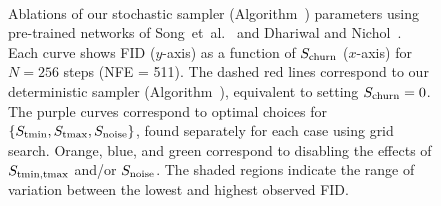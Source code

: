 {\begin{figure}[t]
{
}\\\hfill%
\hfill%
\hfill%
\hfill%
\caption{\label{fig:SdePlotChurn}%
Ablations of our stochastic sampler (Algorithm~) parameters using pre-trained networks of Song~et~al.~\cite{Song2021sde} and Dhariwal and Nichol~\cite{Dhariwal2021}.
Each curve shows FID ($y$-axis) as a function of $S_\text{churn}$ ($x$-axis) for $N = 256$ steps (NFE = 511).
The dashed red lines correspond to our deterministic sampler (Algorithm~), equivalent to setting $S_\text{churn} = 0$.
The purple curves correspond to optimal choices for $\{S_\text{tmin}, S_\text{tmax}, S_\text{noise}\}$, found separately for each case using grid search.
Orange, blue, and green correspond to disabling the effects of $S_\text{tmin,tmax}$ and/or $S_\text{noise}$.
The shaded regions indicate the range of variation between the lowest and highest observed FID.
}
\end{figure}
}

\newcommand{\tabSdeTable}{%
\forcenewcolumntype{x}{>{\centering\arraybackslash\hspace{0pt}}p{12mm}}%
\renewcommand{\cs}{\hspace{0.5mm}}%
\tabulinesep=0.7mm%
\tabulinestyle{0.17mm}%
\begin{table}[t]%
\centering%
\footnotesize%
\caption{\label{tab:SdeTable}%
Evaluation and ablations of our improvements to stochastic sampling.
The values correspond to the curves shown in Figure~\refpaper{fig:SdePlotNfe}.
}
\vspace{1.5mm}%
\begin{tabu}{|@{\ \ }l@{\ \ }|x@{\cs}x|x@{\cs}x|x@{\cs}x|}
\tabucline{2-}
\genSdeTable
\tabucline{-}
\end{tabu}%
\end{table}%
}

\newcommand{\imgclasses}{\vlabel{\hhh}{\vv}{\makebox[\vv]{\scriptsize\hrlabel{Agaric}\hrlabel{Daisy}\hrlabel{Valley}\hrlabel{Pizza}\hrlabel{Balloon}\hrlabel{Beagle}\hrlabel{Ostrich}}}}

